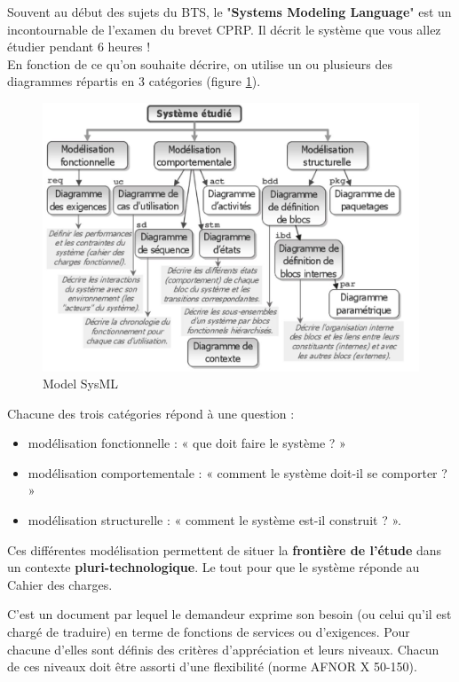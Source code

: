 \documentclass[
	11pt, %
	fleqn, %
	a4paper, %
]{LegrandOrangeBook}
\begin{document}
Souvent au début des sujets du BTS, le "\textbf{Systems Modeling Language}" est un incontournable de l'examen du brevet CPRP. Il décrit le système que vous allez étudier pendant 6 heures !\\
En fonction de ce qu'on souhaite décrire, on utilise un ou plusieurs des diagrammes répartis en 3 catégories (figure \ref{Sys1}).


\begin{figure}[H] %
	\centering %
	\includegraphics[width=1\textwidth]{Images/Sys1.JPG} %
	\caption{Model SysML}
	\label{Sys1} %
\end{figure}

Chacune des trois catégories répond à une question :
\begin{itemize}
    \item modélisation fonctionnelle : « que doit faire le système ? »
    \item modélisation comportementale : « comment le système doit-il se comporter ? »
    \item modélisation structurelle : « comment le système est-il construit ? ».
\end{itemize}
Ces différentes modélisation permettent de situer la \textbf{frontière de l’étude} dans un contexte \textbf{pluri-technologique}. Le tout pour que le système réponde au Cahier des charges.

\begin{definition}
    C’est un document par lequel le demandeur exprime son besoin (ou celui qu'il est chargé de
traduire) en terme de fonctions de services ou d’exigences. Pour chacune d’elles sont définis
des critères d’appréciation et leurs niveaux. Chacun de ces niveaux doit être assorti d’une
flexibilité (norme AFNOR X 50-150).
\end{definition}
\end{document}
